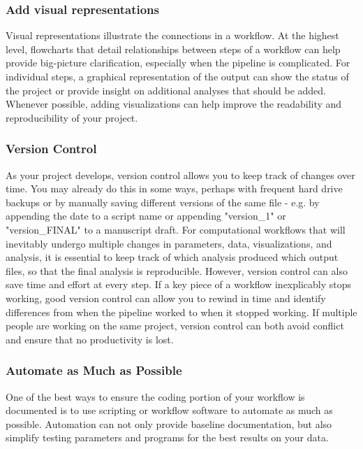 \documentclass[10pt,letterpaper]{article}
\begin{document}
\subsubsection*{Add visual representations} 
Visual representations illustrate the connections in a workflow. 
At the highest level, flowcharts that detail relationships between steps of a workflow can help provide big-picture clarification, especially when the pipeline is complicated. 
For individual steps, a graphical representation of the output can show the status of the project or provide insight on additional analyses that should be added. 
Whenever possible, adding visualizations can help improve the readability and reproducibility of your project.

\subsubsection*{Version Control} 
As your project develops, version control allows you to keep track of changes over time. 
You may already do this in some ways, perhaps with frequent hard drive backups or by manually saving different versions of the same file  - e.g. by appending the date to a script name or appending "version\_1" or "version\_FINAL" to a manuscript draft. 
For computational workflows that will inevitably undergo multiple changes in parameters, data, visualizations, and analysis, it is essential to keep track of which analysis produced which output files, so that the final analysis is reproducible. 
However, version control can also save time and effort at every step. 
If a key piece of a workflow inexplicably stops working, good version control can allow you to rewind in time and identify differences from when the pipeline worked to when it stopped working. 
If multiple people are working on the same project, version control can both avoid conflict and ensure that no productivity is lost. 


 \subsubsection*{Automate as Much as Possible} 
One of the best ways to ensure the coding portion of your workflow is documented is to use scripting or workflow software to automate as much as possible. 
Automation can not only provide baseline documentation, but also simplify testing parameters and programs for the best results on your data. 
\end{document}
